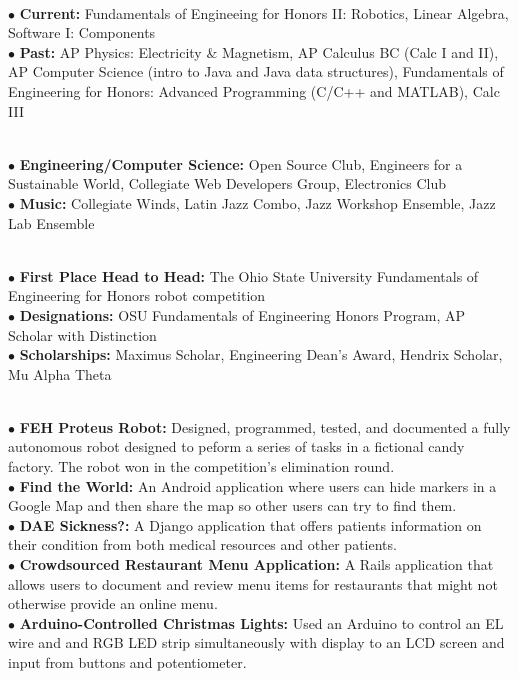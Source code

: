 \documentclass[10pt]{article}
\begin{document}
\\
\smallskip
$\bullet$ {\bf Current:} Fundamentals of Engineeing for Honors II: Robotics, Linear Algebra, Software I: Components\\
$\bullet$ {\bf Past:} AP Physics: Electricity \& Magnetism, AP Calculus BC (Calc I and II), AP Computer Science (intro to Java and Java data structures), Fundamentals of Engineering for Honors: Advanced Programming (C/C++ and MATLAB), Calc III
\medskip

\\
\smallskip
$\bullet$ {\bf Engineering/Computer Science:} Open Source Club, Engineers for a Sustainable World, Collegiate Web Developers Group, Electronics Club\\
$\bullet$ {\bf Music:} Collegiate Winds, Latin Jazz Combo, Jazz Workshop Ensemble, Jazz Lab Ensemble
\medskip

\\
\smallskip
$\bullet$ {\bf First Place Head to Head:} The Ohio State University Fundamentals of Engineering for Honors robot competition\\
$\bullet$ {\bf Designations:} OSU Fundamentals of Engineering Honors Program, AP Scholar with Distinction\\
$\bullet$ {\bf Scholarships:} Maximus Scholar, Engineering Dean's Award, Hendrix Scholar, Mu Alpha Theta
\medskip

\\
\smallskip
$\bullet$ {\bf FEH Proteus Robot:} Designed, programmed, tested, and documented a fully autonomous robot designed to peform a series of tasks in a fictional candy factory. The robot won in the competition's elimination round.\\
$\bullet$ {\bf Find the World:} An Android application where users can hide markers in a Google Map and then share the map so other users can try to find them.\\
$\bullet$ {\bf DAE Sickness?:} A Django application that offers patients information on their condition from both medical resources and other patients.\\
$\bullet$ {\bf Crowdsourced Restaurant Menu Application:} A Rails application that allows users to document and review menu items for restaurants that might not otherwise provide an online menu.\\
$\bullet$ {\bf Arduino-Controlled Christmas Lights:} Used an Arduino to control an EL wire and and RGB LED strip simultaneously with display to an LCD screen and input from buttons and potentiometer.
\medskip
\end{document}
